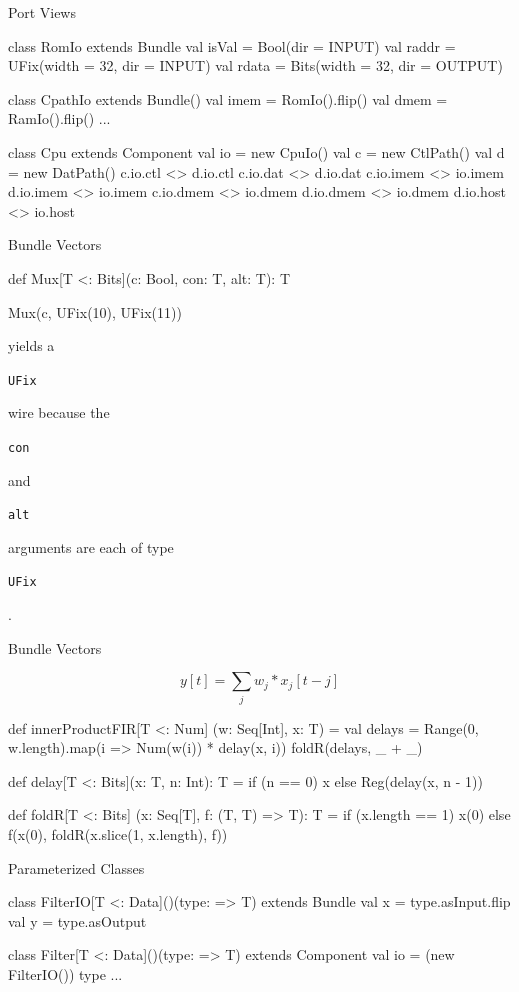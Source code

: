 \documentclass[xcolor=pdflatex,dvipsnames,table]{beamer}
\newcommand{\kode}[1]{\begin{footnotesize}{\tt #1}\end{footnotesize}}
\begin{document}

\begin{frame}[fragile]{Port Views}
\begin{scala}
class RomIo extends Bundle {
  val isVal = Bool(dir = INPUT)
  val raddr = UFix(width = 32, dir = INPUT)
  val rdata = Bits(width = 32, dir = OUTPUT)
}

class CpathIo extends Bundle() {
  val imem = RomIo().flip()
  val dmem = RamIo().flip()
  ...
}

class Cpu extends Component {
  val io = new CpuIo()
  val c  = new CtlPath()
  val d  = new DatPath()
  c.io.ctl  <> d.io.ctl
  c.io.dat  <> d.io.dat
  c.io.imem <> io.imem
  d.io.imem <> io.imem
  c.io.dmem <> io.dmem
  d.io.dmem <> io.dmem
  d.io.host <> io.host
}
\end{scala}
\end{frame}


\begin{frame}[fragile]{Bundle Vectors}
\begin{scala}
def Mux[T <: Bits](c: Bool, con: T, alt: T): T

Mux(c, UFix(10), UFix(11))
\end{scala}

\noindent
yields a \kode{UFix} wire because the \kode{con} and \kode{alt} arguments are each of type \kode{UFix}.
\end{frame}

\begin{frame}[fragile]{Bundle Vectors}

\begin{equation}
y[t] = \sum_j w_j * x_j[t-j]
\end{equation}

\begin{scala}
def innerProductFIR[T <: Num] (w: Seq[Int], x: T) = {
  val delays = Range(0, w.length).map(i => Num(w(i)) * delay(x, i))
  foldR(delays, _ + _)
}

def delay[T <: Bits](x: T, n: Int): T =
  if (n == 0) x else Reg(delay(x, n - 1))

def foldR[T <: Bits] (x: Seq[T], f: (T, T) => T): T =
  if (x.length == 1)
    x(0) 
  else 
    f(x(0), foldR(x.slice(1, x.length), f))
\end{scala}

\end{frame}

\begin{frame}[fragile]{Parameterized Classes}
\begin{scala}
class FilterIO[T <: Data]()(type: => T) extends Bundle { 
  val x = type.asInput.flip
  val y = type.asOutput
}

class Filter[T <: Data]()(type: => T) extends Component { 
  val io = (new FilterIO()){ type }
  ...
}
\end{scala}
\end{frame}
\end{document}
